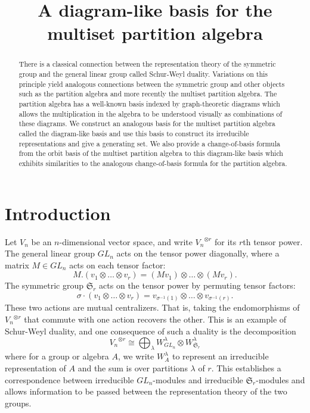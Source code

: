 \documentclass[ALCO,Unicode,published]{cedram}
\title{A diagram-like basis for the multiset partition algebra}
\author[\initial{A.} \middlename{N.} Wilson]{\firstname{Alexander} \middlename{N.} \lastname{Wilson}}
\newcommand{\SG}{\mathfrak{S}}
\begin{document}
\begin{abstract}
  There is a classical connection between the representation theory of the symmetric group and the general linear group called Schur-Weyl duality. Variations on this principle yield analogous connections between the symmetric group and other objects such as the partition algebra and more recently the multiset partition algebra. The partition algebra has a well-known basis indexed by graph-theoretic diagrams which allows the multiplication in the algebra to be understood visually as combinations of these diagrams. We construct an analogous basis for the multiset partition algebra called the diagram-like basis and use this basis to construct its irreducible representations and give a generating set. We also provide a change-of-basis formula from the orbit basis of the multiset partition algebra to this diagram-like basis which exhibits similarities to the analogous change-of-basis formula for the partition algebra.
\end{abstract}

\maketitle


\section{Introduction}

Let $V_n$ be an $n$-dimensional vector space, and write ${V_n}^{\otimes r}$ for its $r$th tensor power. The general linear group $GL_n$ acts on the tensor power diagonally, where a matrix $M\in GL_n$ acts on each tensor factor: \[M.(v_1\otimes\dots\otimes v_r)=(Mv_1)\otimes\dots\otimes (Mv_r).\] The symmetric group $\SG_r$ acts on the tensor power by permuting tensor factors: \[\sigma\cdot(v_1\otimes\dots\otimes v_r)=v_{\sigma^{-1}(1)}\otimes\dots\otimes v_{\sigma^{-1}(r)}.\] These two actions are mutual centralizers. That is, taking the endomorphisms of ${V_n}^{\otimes r}$ that commute with one action recovers the other. This is an example of Schur-Weyl duality, and one consequence of such a duality is the decomposition \[{V_n}^{\otimes r}\cong\bigoplus_{\lambda}W_{GL_n}^\lambda\otimes W_{\SG_r}^\lambda\] where for a group or algebra $A$, we write $W_A^\lambda$ to represent an irreducible representation of $A$ and the sum is over partitions $\lambda$ of $r$. This establishes a correspondence between irreducible $GL_n$-modules and irreducible $\SG_r$-modules and allows information to be passed between the representation theory of the two groups.
\end{document}
